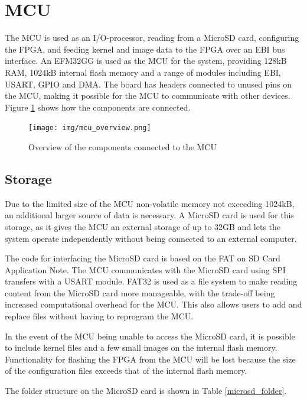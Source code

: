 \section{MCU}

The MCU is used as an I/O-processor, reading from a MicroSD card, configuring the FPGA, and feeding kernel and image data to the FPGA over an EBI bus interface. An EFM32GG is used as the MCU for the system, providing 128kB RAM, 1024kB internal flash memory and a range of modules including EBI, USART, GPIO and DMA. The board has headers connected to unused pins on the MCU, making it possible for the MCU to communicate with other devices. Figure \ref{fig:mcuOverview} shows how the components are connected.

\begin{figure}[h!]
    \texttt{[image: img/mcu\_overview.png]}
    \caption{Overview of the components connected to the MCU}
    \label{fig:mcuOverview}
\end{figure}

\subsection{Storage}
Due to the limited size of the MCU non-volatile memory not exceeding 1024kB, an additional larger source of data is necessary. A MicroSD card is used for this storage, as it gives the MCU an external storage of up to 32GB and lets the system operate independently without being connected to an external computer.

The code for interfacing the MicroSD card is based on the FAT on SD Card Application Note\cite{an0030}. The MCU communicates with the MicroSD card using SPI transfers with a USART module. FAT32 is used as a file system to make reading content from the MicroSD card more manageable, with the trade-off being increased computational overhead for the MCU. This also allows users to add and replace files without having to reprogram the MCU.

In the event of the MCU being unable to access the MicroSD card, it is possible to include kernel files and a few small images on the internal flash memory. Functionality for flashing the FPGA from the MCU will be lost because the size of the configuration files exceeds that of the internal flash memory.

The folder structure on the MicroSD card is shown in Table \ref{microsd_folder}.

